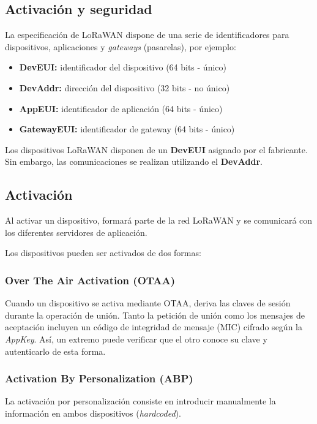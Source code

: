 \documentclass[11pt,a4paper]{article}
\begin{document}
\newpage

\subsection{Activación y seguridad}
La especificación de LoRaWAN dispone de una serie de identificadores para dispositivos, aplicaciones y \textit{gateways} (pasarelas), por ejemplo:
\begin{itemize}
\item \textbf{DevEUI:} identificador del dispositivo (64 bits - único)
\item \textbf{DevAddr:} dirección del dispositivo (32 bits - no único)
\item \textbf{AppEUI:} identificador de aplicación (64 bits - único)
\item \textbf{GatewayEUI:} identificador de gateway (64 bits - único)
\end{itemize}

Los dispositivos LoRaWAN disponen de un \textbf{DevEUI} asignado por el fabricante. Sin embargo, las comunicaciones se realizan utilizando el \textbf{DevAddr}.

\subsection*{Activación}
Al activar un dispositivo, formará parte de la red LoRaWAN y se comunicará con los diferentes servidores de aplicación.

\medskip

Los dispositivos pueden ser activados de dos formas:
\subsubsection*{Over The Air Activation (OTAA)}
Cuando un dispositivo se activa mediante OTAA, deriva las claves de sesión durante la operación de unión. Tanto la petición de unión como los mensajes de aceptación incluyen un código de integridad de mensaje (MIC) cifrado según la \textit{AppKey}. Así, un extremo puede verificar que el otro conoce su clave y autenticarlo de esta forma.

\subsubsection*{Activation By Personalization (ABP)}
La activación por personalización consiste en introducir manualmente la información en ambos dispositivos (\textit{hardcoded}). 
\end{document}
